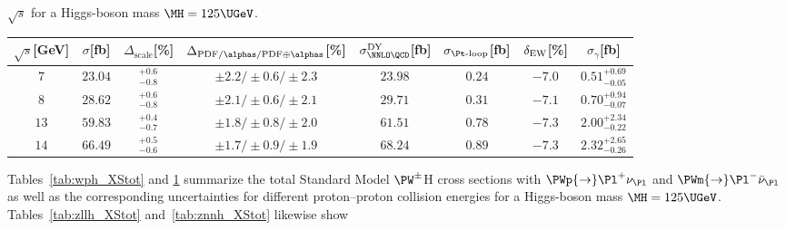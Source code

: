 \begin{table}
{$\sqrt{s}$ for a Higgs-boson mass $\MH=125\UGeV$.}
\label{tab:wmh_XStot}
\begin{center}%
\begin{small}%
\begin{tabular}{cccccccc}%
\hline
$\sqrt{s}$[GeV] & $\sigma$[fb] & $\Delta_{\mathrm{scale}}$[\%] & 
$\Delta_{\mathrm{PDF}/\alphas/\mathrm{PDF\oplus\alphas}}$[\%] &
$\sigma_{\NNLO \QCD}^{\DY}$[fb] & $\sigma_{\Pt\mbox{\scriptsize -loop}}$[fb] & 
$\delta_{\mathrm{EW}}$[\%] & $\sigma_{\gamma}$[fb] 
\\
\hline
$7$ & $  23.04$ & ${}_{-0.8}^{+ 0.6}$ & $\pm2.2/\pm0.6/\pm 2.3$ & $  23.98$ & $   0.24$ & $-7.0$ & $  0.51_{ -0.05}^{+  0.69}$ \\
$8$ & $  28.62$ & ${}_{-0.8}^{+ 0.6}$ & $\pm2.1/\pm0.6/\pm 2.1$ & $  29.71$ & $   0.31$ & $-7.1$ & $  0.70_{ -0.07}^{+  0.94}$ \\
$13$ & $  59.83$ & ${}_{-0.7}^{+ 0.4}$ & $\pm1.8/\pm0.8/\pm 2.0$ & $  61.51$ & $   0.78$ & $-7.3$ & $  2.00_{ -0.22}^{+  2.34}$ \\
$14$ & $  66.49$ & ${}_{-0.6}^{+ 0.5}$ & $\pm1.7/\pm0.9/\pm 1.9$ & $  68.24$ & $   0.89$ & $-7.3$ & $  2.32_{ -0.26}^{+  2.65}$ \\
\hline
\end{tabular}%
\end{small}%
\end{center}%
\end{table}
Tables~\ref{tab:wph_XStot} and \ref{tab:wmh_XStot} summarize the total 
Standard Model $\PW^\pm$H cross sections with $\PWp{\to}\Pl^+\nu_{\Pl}$
and $\PWm{\to}\Pl^-\bar\nu_{\Pl}$
as well as the corresponding uncertainties
for different proton--proton collision energies
for a Higgs-boson mass $\MH=125\UGeV$.
Tables~\ref{tab:zllh_XStot} and~\ref{tab:znnh_XStot} likewise show
